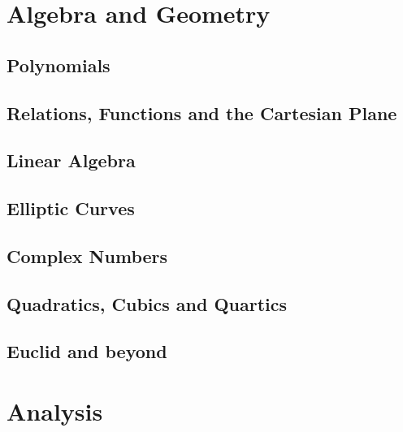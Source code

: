 \documentclass{scrbook}
\begin{document}
\part{Algebra and Geometry}

\chapter{Polynomials} %

\chapter{Relations, Functions and the Cartesian Plane} %

\chapter{Linear Algebra} %

\chapter{Elliptic Curves} %

\chapter{Complex Numbers} %

\chapter{Quadratics, Cubics and Quartics} %

\chapter{Euclid and beyond} %

\part{Analysis}
\end{document}

